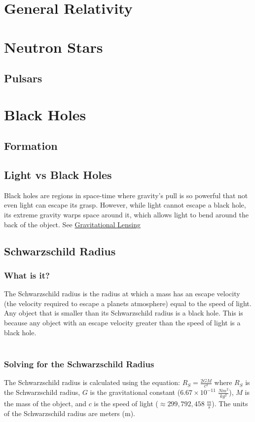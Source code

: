 \documentclass{article}
\begin{document}
\section{General Relativity}\label{sec:generalrelativity}




\section{Neutron Stars}

\subsection{Pulsars}




\section{Black Holes}
\subsection{Formation}
\subsection{Light vs Black Holes}
Black holes are regions in space-time where gravity's pull is so powerful that not even light can escape its grasp. However, while light cannot escape a black hole, its extreme gravity warps space around it, which allows light to bend around the back of the object. See \hyperref[sec:gravitational_lensing]{Gravitational Lensing}

\subsection{Schwarzschild Radius}
\subsubsection{What is it?}
The Schwarzschild radius is the radius at which a mass has an escape velocity (the velocity required to escape a planets atmosphere) equal to the speed of light. Any object that is smaller than its Schwarzschild radius is a black hole. This is because any object with an escape velocity greater than the speed of light is a black hole.\\\\

\subsubsection{Solving for the Schwarzschild Radius}
The Schwarzschild radius is calculated using the equation: $R_{S} = \frac{2GM}{c^2}$ where $R_{S}$ is the Schwarzschild radius, $G$ is the gravitational constant (\hyperref[sec:constants]{$6.67 \times 10^{-11}\;\frac{Nm^2}{kg^2}$}), $M$ is the mass of the object, and $c$ is the speed of light (\hyperref[sec:constants]{$\approx 299, 792, 458\;\frac{m}{s}$}). The units of the Schwarzschild radius are meters (m).
\end{document}
